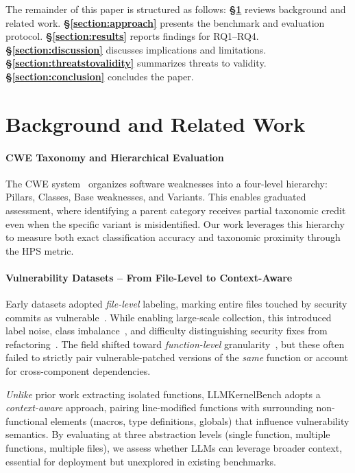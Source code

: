 \documentclass[lettersize,journal]{IEEEtran}
\begin{document}
The remainder of this paper is structured as follows: \textbf{\S\ref{section:related_work}} reviews background and related work. \textbf{\S\ref{section:approach}} presents the benchmark and evaluation protocol. \textbf{\S\ref{section:results}} reports findings for RQ1--RQ4. \textbf{\S\ref{section:discussion}} discusses implications and limitations. \textbf{\S\ref{section:threatstovalidity}} summarizes threats to validity. \textbf{\S\ref{section:conclusion}} concludes the paper.


\section{Background and Related Work}
\label{section:related_work}

\paragraph*{\gls{CWE} Taxonomy and Hierarchical Evaluation}
The \gls{CWE} system~\cite{mitre_cwe} organizes software weaknesses into a four-level hierarchy: Pillars, Classes, Base weaknesses, and Variants. This enables graduated assessment, where identifying a parent category receives partial taxonomic credit even when the specific variant is misidentified. Our work leverages this hierarchy to measure both exact classification accuracy and taxonomic proximity through the \gls{HPS} metric.

\paragraph*{Vulnerability Datasets -- From File-Level to Context-Aware}
Early datasets adopted \emph{file-level} labeling, marking entire files touched by security commits as vulnerable~\cite{chakraborty2021deep, wang2021patchdb, zheng2021d2a, ni2024megavul}. While enabling large-scale collection, this introduced label noise, class imbalance~\cite{gao2023far}, and difficulty distinguishing security fixes from refactoring~\cite{iannone2022secret, croft2023data}. The field shifted toward \emph{function-level} granularity~\cite{zhou2019devign, bhandari2021cvefixes}, but these often failed to strictly pair vulnerable-patched versions of the \emph{same} function or account for cross-component dependencies.

\emph{Unlike} prior work extracting isolated functions, LLMKernelBench adopts a \emph{context-aware} approach, pairing line-modified functions with surrounding non-functional elements (macros, type definitions, globals) that influence vulnerability semantics. By evaluating at three abstraction levels (single function, multiple functions, multiple files), we assess whether \glspl{LLM} can leverage broader context, essential for deployment but unexplored in existing benchmarks.
\end{document}

